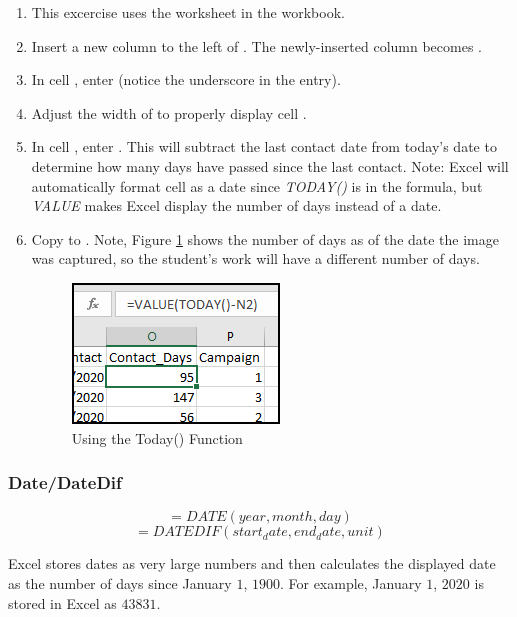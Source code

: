 \begin{enumerate}
	\item This excercise uses the  worksheet in the  workbook.
	\item Insert a new column to the left of . The newly-inserted column becomes .
	\item In cell , enter  (notice the underscore in the entry).
	\item Adjust the width of  to properly display cell .
	\item In cell , enter . This will subtract the last contact date from today's date to determine how many days have passed since the last contact. Note: Excel will automatically format cell  as a date since \textit{TODAY()} is in the formula, but \textit{VALUE} makes Excel display the number of days instead of a date.
	\item Copy  to . Note, Figure \ref{09:fig45} shows the number of days as of the date the image was captured, so the student's work will have a different number of days.
	
	\begin{figure}[H]
		\centering
		\includegraphics[width=\maxwidth{.50\linewidth}]{gfx/ch09_fig45}
		\caption{Using the Today() Function}
		\label{09:fig45}
	\end{figure}
	
\end{enumerate}

\subsubsection{Date/DateDif}

\[ =DATE(year, month, day) \]
\[ =DATEDIF (start_date, end_date, unit) \]

Excel stores dates as very large numbers and then calculates the displayed date as the number of days since January $ 1 $, $ 1900 $. For example, January $ 1 $, $ 2020 $ is stored in Excel as $ 43831 $. 


